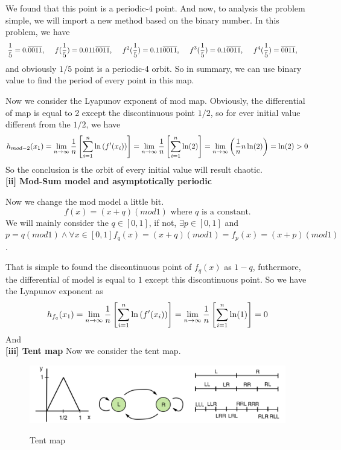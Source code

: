 \documentclass[12pt]{article}
\theoremstyle{plain}
\begin{document}
We found that this point is a periodic-4 point. And now, to analysis the problem simple, we will import a new method based on the binary number. In this problem, we have
$$
{1\over 5} = 0.\overline{0011}, \ \ \ \ f({1\over 5}) = 0.011\overline{0011}, \ \ \ \ f^2({1\over 5}) = 0.11\overline{0011}, \ \ \ \ f^3({1\over 5}) = 0.1\overline{0011}, \ \ \ \ f^4({1\over 5}) = \overline{0011}, \ \ \ \ 
$$
and obviously $1/5$ point is a periodic-4 orbit. So in summary, we can use binary value to find the period of every point in this map.

Now we consider the Lyapunov exponent of mod map. Obviously, the differential of map is equal to 2 except the discontinuous point $1/2$, so for ever initial value different from the $1/2$, we have
$$
h_{mod-2}(x_1) = \lim_{n \rightarrow \infty}{1\over n}\left[\sum_{i = 1}^{n}\ln\left(f'(x_i)\right)\right] = \lim_{n \rightarrow \infty}{1\over n}\left[\sum_{i = 1}^{n} \ln(2)\right] = \lim_{n \rightarrow \infty}\left({1 \over n} n \ln(2)\right) = \ln(2) > 0
$$
So the conclusion is the orbit of every initial value will result chaotic.\\[2ex]




\textbf{[ii] Mod-Sum model and asymptotically periodic}

Now we change the mod model a little bit.
$$
f(x) = (x + q)(mod 1) \text{ where } q \text{ is a constant.}
$$
We will mainly consider the $q \in [0, 1]$, if not, $\exists p \in [0, 1]$ and $p = q(mod 1) \land \forall x \in [0, 1] f_q(x) = (x+q)(mod 1) = f_p(x) = (x+p)(mod 1)$.

That is simple to found the discontinuous point of $f_q(x)$ as $1 - q$, futhermore, the differential of model is equal to $1$ except this discontinuous point. So we have the Lyapunov exponent as 
$$
h_{f_q}(x_1) = \lim_{n \rightarrow \infty}{1\over n}\left[\sum_{i = 1}^{n}\ln\left(f'(x_i)\right)\right] = \lim_{n \rightarrow \infty}{1\over n}\left[\sum_{i = 1}^{n} \ln(1)\right] = 0
$$
And\\[2ex]







\textbf{[iii] Tent map}
Now we consider the tent map. 
\begin{figure}[H]
\begin{center}
\includegraphics[width=1\textwidth]{figure/section3/tent-map.png} \\
\caption{Tent map}\label{tent-map}
\end{center}
\end{figure}
\end{document}
